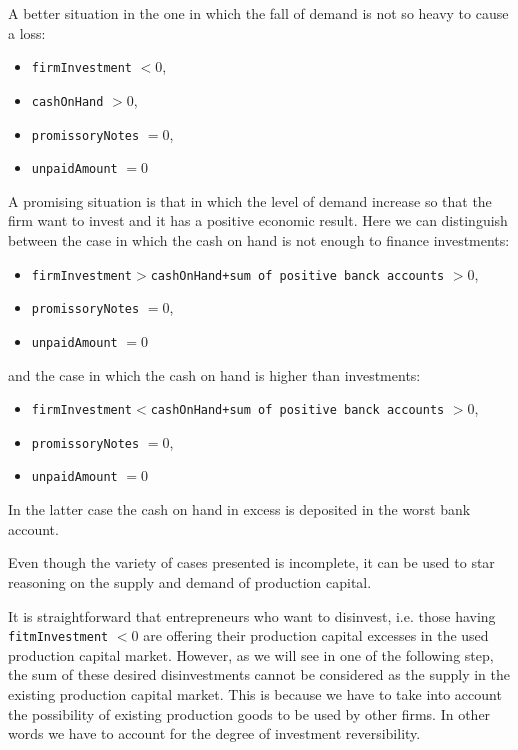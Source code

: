 \documentclass{book}
\begin{document}
A better situation in the one in which the fall of demand is not so heavy to cause a loss:\\
\begin{itemize}
	\item \verb+firmInvestment+ $<0$,
	\item \verb+cashOnHand+ $>0$,
	\item \verb+promissoryNotes+ $=0$,
	\item \verb+unpaidAmount+ $=0$
\end{itemize}

A promising situation is that in which the level of demand increase so that the firm want to invest and it has a positive economic result. Here we can distinguish between the case in which the cash on hand is not enough to finance investments:\\  
\begin{itemize}
	\item \verb+firmInvestment+$>$\verb|cashOnHand+sum of positive banck accounts| $>0$, 
	\item \verb+promissoryNotes+ $=0$, 
	\item \verb+unpaidAmount+ $=0$
\end{itemize}
and the case in which the cash on hand is higher than investments:\\
\begin{itemize}
	\item \verb+firmInvestment+$ < $\verb|cashOnHand+sum of positive banck accounts| $>0$, 
	\item \verb+promissoryNotes+ $=0$, 
	\item \verb+unpaidAmount+ $=0$
\end{itemize}
In the latter case the cash on hand in excess is deposited in the worst bank account.

Even though the variety of cases presented is incomplete, it can be used to star reasoning on the supply and demand of production capital.

It is straightforward that entrepreneurs who want to disinvest, i.e. those having \verb+fitmInvestment+ $<0$ are offering their production capital excesses in the used production capital market. 
However, as we will see in one of the following step, the sum of these desired disinvestments cannot be considered as the supply in the existing production capital market. This is because we have to take into account the possibility of existing production goods to be used by other firms. In other words we have to account for the degree of investment reversibility.
\end{document}
